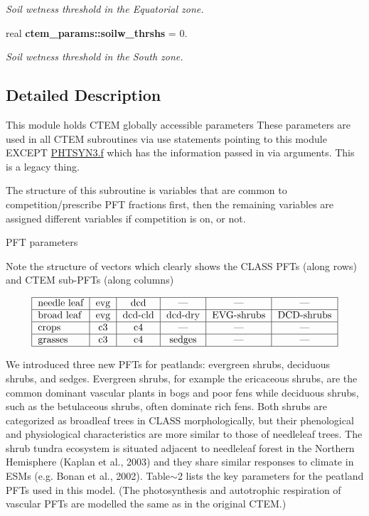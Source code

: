 \begin{DoxyCompactItemize}
\begin{DoxyCompactList}\small\item\em Soil wetness threshold in the Equatorial zone. \end{DoxyCompactList}\item 
\hypertarget{namespacectem__params_ae3cc62b58531c7d353cc8baac1c1fd6a}{}real {\bfseries ctem\+\_\+params\+::soilw\+\_\+thrshs} = 0.\label{namespacectem__params_ae3cc62b58531c7d353cc8baac1c1fd6a}

\begin{DoxyCompactList}\small\item\em Soil wetness threshold in the South zone. \end{DoxyCompactList}\end{DoxyCompactItemize}


\subsection{Detailed Description}
This module holds C\+T\+E\+M globally accessible parameters These parameters are used in all C\+T\+E\+M subroutines via use statements pointing to this module E\+X\+C\+E\+P\+T \hyperlink{PHTSYN3_8f}{P\+H\+T\+S\+Y\+N3.\+f} which has the information passed in via arguments. This is a legacy thing. 

The structure of this subroutine is variables that are common to competition/prescribe P\+F\+T fractions first, then the remaining variables are assigned different variables if competition is on, or not.

P\+F\+T parameters

Note the structure of vectors which clearly shows the C\+L\+A\+S\+S P\+F\+Ts (along rows) and C\+T\+E\+M sub-\/\+P\+F\+Ts (along columns)

\[ \begin{tabular} { | l | c | c | c | c | c | } \hline needle leaf & evg & dcd & --- & ---& ---\\ \hline broad leaf & evg & dcd-cld & dcd-dry & EVG-shrubs & DCD-shrubs\\ \hline crops & c3 & c4 & --- & ---& ---\\ \hline grasses & c3 & c4 & sedges & ---& ---\\ \hline \end{tabular} \]

We introduced three new P\+F\+Ts for peatlands\+: evergreen shrubs, deciduous shrubs, and sedges. Evergreen shrubs, for example the ericaceous shrubs, are the common dominant vascular plants in bogs and poor fens while deciduous shrubs, such as the betulaceous shrubs, often dominate rich fens. Both shrubs are categorized as broadleaf trees in C\+L\+A\+S\+S morphologically, but their phenological and physiological characteristics are more similar to those of needleleaf trees. The shrub tundra ecosystem is situated adjacent to needleleaf forest in the Northern Hemisphere (Kaplan et al., 2003) and they share similar responses to climate in E\+S\+Ms (e.\+g. Bonan et al., 2002). Table$\sim$2 lists the key parameters for the peatland P\+F\+Ts used in this model. (The photosynthesis and autotrophic respiration of vascular P\+F\+Ts are modelled the same as in the original C\+T\+E\+M.) 